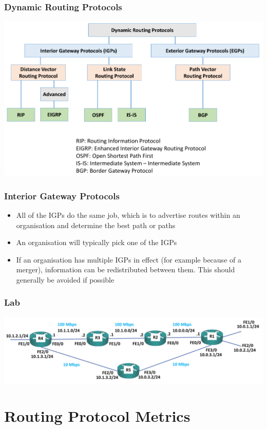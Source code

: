 \documentclass[pdflatex,compress,mathserif]{beamer}
\begin{document}
\begin{frame}
	\frametitle{Dynamic Routing Protocols}
	\begin{center}
		\includegraphics[width=\linewidth]{img/img07}
	\end{center}
\end{frame}

\begin{frame}
	\frametitle{Interior Gateway Protocols}
	\begin{itemize}
		\item All of the IGPs do the same job, which is to advertise routes within an
 organisation and determine the best path or paths
		\item An organisation will typically pick one of the IGPs
		\item If an organisation has multiple IGPs in effect (for example because of a
 merger), information can be redistributed between them. This should
 generally be avoided if possible
	\end{itemize}
\end{frame}

\begin{frame}
	\frametitle{Lab}
	\begin{center}
		\includegraphics[width=\linewidth]{img/img08}
	\end{center}
\end{frame}

\section{Routing Protocol Metrics}
\end{document}

